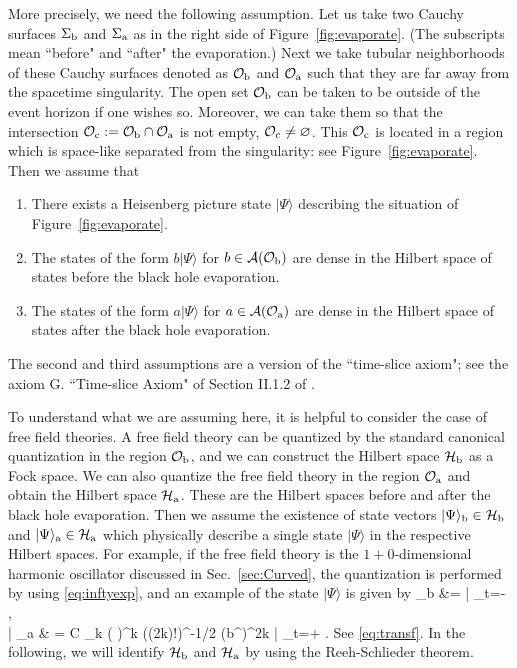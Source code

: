 \documentclass[12pt,a4paper]{article}
\theoremstyle{plain}
\theoremstyle{definition}
\numberwithin{thm}{section}
\newcommand{\ket}[1]{ | {#1} \rangle }
\def\CA{{\cal A}}
\def\CH{{\cal H}}
\def\CO{{\cal O}}
\def\beq#1\eeq{\begin{align}#1\end{align}}
\begin{document}
More precisely, we need the following assumption. Let us take two Cauchy surfaces $\Sigma_{\rm b}$ and $\Sigma_{\rm a}$
as in the right side of Figure~\ref{fig:evaporate}.  (The subscripts mean ``before" and ``after" the evaporation.)
Next we take tubular neighborhoods of these Cauchy surfaces denoted as 
$\CO_{\rm b}$ and $\CO_{\rm a}$ such that they are far away from the spacetime singularity.
The open set $\CO_{\rm b}$ can be taken to be outside of the event horizon if one wishes so. 
Moreover, we can take them so that the intersection $\CO_{\rm c}:= \CO_{\rm b} \cap \CO_{\rm a}$ is not empty, $\CO_{\rm c} \neq \varnothing$.
This $\CO_{\rm c}$ is located in a region which is space-like separated from the singularity: see Figure~\ref{fig:evaporate}.
Then we assume that
\begin{enumerate}
\item There exists a Heisenberg picture state $\ket{\Psi}$ describing the situation of Figure~\ref{fig:evaporate}.
\item The states of the form $ b\ket{\Psi}$ for $b \in \CA(\CO_{\rm b})$ are dense in the Hilbert space of states before the black hole evaporation.
\item The states of the form $ a\ket{\Psi}$ for $a \in \CA(\CO_{\rm a})$ are dense in the Hilbert space of states after the black hole evaporation.
\end{enumerate}
The second and third assumptions are a version of the ``time-slice axiom"; see the axiom G. ``Time-slice Axiom" of Section II.1.2 of \cite{Haag:1992hx}.

To understand what we are assuming here, it is helpful to consider the case of free field theories.
A free field theory can be quantized by the standard canonical quantization in the region $\CO_{\rm b}$, and we can construct the Hilbert space $\CH_{\rm b}$ as a Fock space.
We can also quantize the free field theory in the region $\CO_{\rm a}$ and obtain the Hilbert space $\CH_{\rm a}$. These are the Hilbert spaces before and after the
black hole evaporation. Then we assume the existence of state vectors $\ket{\Psi}_{\rm b} \in \CH_{\rm b}$ and $\ket{\Psi}_{\rm a} \in \CH_{\rm a}$ which physically describe a single state $\ket{\Psi}$
in the respective Hilbert spaces. For example, if the free field theory is the $1+0$-dimensional harmonic oscillator discussed in Sec.~\ref{sec:Curved},
the quantization is performed by using \eqref{eq:inftyexp}, and an example of the state $\ket{\Psi}$ is given by 
\beq
\ket{\Psi}_{\rm b} &=\ket{\Omega_{t=-\infty}}, \\
\ket{\Psi}_{\rm a} & = C \sum_{k }\left( \frac{\beta}{\alpha} \right)^k  \cdot  ((2k)!)^{-1/2} (b^\dagger)^{2k}\ket{\Omega_{t=+\infty}} .
\eeq
See \eqref{eq:transf}. In the following, we will identify $\CH_{\rm b}$ and $\CH_{\rm a}$ by using the Reeh-Schlieder theorem.
\end{document}
